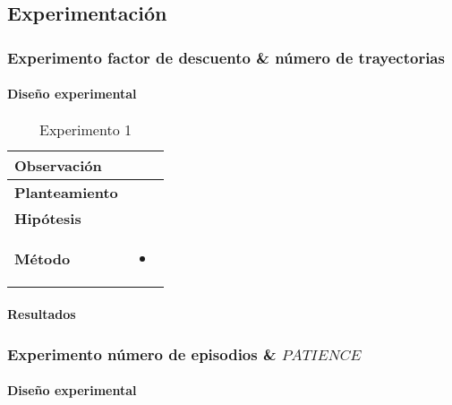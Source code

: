 \subsection{Experimentación}

\subsubsection{Experimento factor de descuento \& número de trayectorias}

\paragraph{Diseño experimental}
\begin{table}[H]
    \centering
    \begin{tabularx}{\textwidth}{|p{4cm}|X|} %
        \hline %
        \textbf{Observación} &  
        \\ \hline 
        \textbf{Planteamiento} & 
        \\ \hline 
        \textbf{Hipótesis} & 
        \\ \hline 
        \textbf{Método} & 
        \begin{itemize}
            \item 
        \end{itemize}
        \\ \hline
    \end{tabularx}
    \caption{Experimento 1}
    \label{tab:tabla1}
\end{table}

\paragraph{Resultados}

\subsubsection{Experimento número de episodios \& $PATIENCE$}

\paragraph{Diseño experimental}


